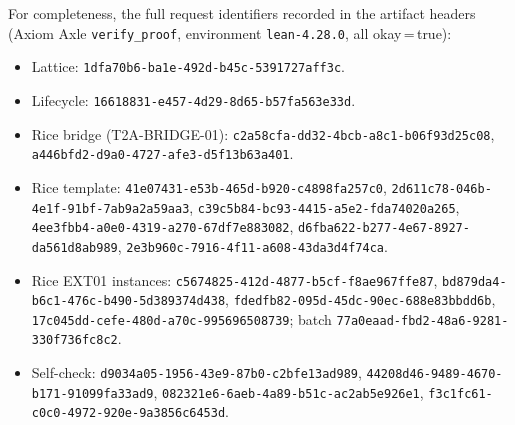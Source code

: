 \documentclass[11pt]{article}
\theoremstyle{definition}
\theoremstyle{remark}
\newcommand{\rid}[1]{\texttt{#1}}
\begin{document}
For completeness, the full request identifiers recorded in the artifact
headers (Axiom Axle \texttt{verify\_proof}, environment
\texttt{lean-4.28.0}, all okay\,=\,true):
\begin{itemize}
\item Lattice: \rid{1dfa70b6-ba1e-492d-b45c-5391727aff3c}.
\item Lifecycle: \rid{16618831-e457-4d29-8d65-b57fa563e33d}.
\item Rice bridge (T2A-BRIDGE-01): \rid{c2a58cfa-dd32-4bcb-a8c1-b06f93d25c08},
\rid{a446bfd2-d9a0-4727-afe3-d5f13b63a401}.
\item Rice template: \rid{41e07431-e53b-465d-b920-c4898fa257c0},
\rid{2d611c78-046b-4e1f-91bf-7ab9a2a59aa3},
\rid{c39c5b84-bc93-4415-a5e2-fda74020a265},
\rid{4ee3fbb4-a0e0-4319-a270-67df7e883082},
\rid{d6fba622-b277-4e67-8927-da561d8ab989},
\rid{2e3b960c-7916-4f11-a608-43da3d4f74ca}.
\item Rice EXT01 instances: \rid{c5674825-412d-4877-b5cf-f8ae967ffe87},
\rid{bd879da4-b6c1-476c-b490-5d389374d438},
\rid{fdedfb82-095d-45dc-90ec-688e83bbdd6b},
\rid{17c045dd-cefe-480d-a70c-995696508739}; batch
\rid{77a0eaad-fbd2-48a6-9281-330f736fc8c2}.
\item Self-check: \rid{d9034a05-1956-43e9-87b0-c2bfe13ad989},
\rid{44208d46-9489-4670-b171-91099fa33ad9},
\rid{082321e6-6aeb-4a89-b51c-ac2ab5e926e1},
\rid{f3c1fc61-c0c0-4972-920e-9a3856c6453d}.
\end{itemize}
\end{document}
